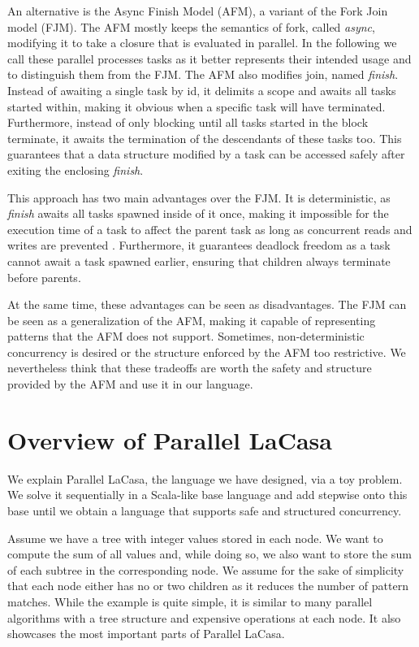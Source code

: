 An alternative is the Async Finish Model (AFM), a variant of the Fork Join model (FJM). The AFM mostly keeps the semantics of fork, called \textit{async}, modifying it to take a closure that is evaluated in parallel. In the following we call these parallel processes tasks as it better represents their intended usage and to distinguish them from the FJM. The AFM also modifies join, named \textit{finish}. Instead of awaiting a single task by id, it delimits a scope and awaits all tasks started within, making it obvious when a specific task will have terminated. Furthermore, instead of only blocking until all tasks started in the block terminate, it awaits the termination of the descendants of these tasks too. This guarantees that a data structure modified by a task can be accessed safely after exiting the enclosing \textit{finish}.

This approach has two main advantages over the FJM. It is deterministic, as \textit{finish} awaits all tasks spawned inside of it once, making it impossible for the execution time of a task to affect the parent task as long as concurrent reads and writes are prevented \cite{lee_featherweight_2010}. Furthermore, it guarantees deadlock freedom as a task cannot await a task spawned earlier, ensuring that children always terminate before parents.

At the same time, these advantages can be seen as disadvantages. The FJM can be seen as a generalization of the AFM, making it capable of representing patterns that the AFM does not support. Sometimes, non-deterministic concurrency is desired or the structure enforced by the AFM too restrictive. We nevertheless think that these tradeoffs are worth the safety and structure provided by the AFM and use it in our language.

\chapter{Overview of Parallel LaCasa}\label{overview}
We explain Parallel LaCasa, the language we have designed, via a toy problem. We solve it sequentially in a Scala-like base language and add stepwise onto this base until we obtain a language that supports safe and structured concurrency.

Assume we have a tree with integer values stored in each node. We want to compute the sum of all values and, while doing so, we also want to store the sum of each subtree in the corresponding node. We assume for the sake of simplicity that each node either has no or two children as it reduces the number of pattern matches. While the example is quite simple, it is similar to many parallel algorithms with a tree structure and expensive operations at each node. It also showcases the most important parts of Parallel LaCasa.

